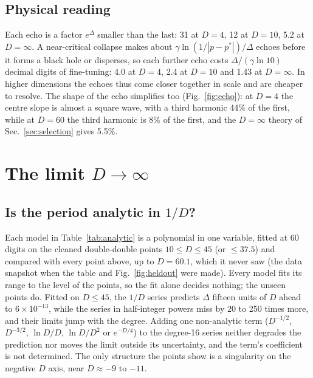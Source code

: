 \documentclass[aps,prd,onecolumn,superscriptaddress,nofootinbib,10pt]{revtex4-2}
\begin{document}
\subsection{Physical reading}

Each echo is a factor $e^{\Delta}$ smaller than the last: 31 at $D = 4$, 12 at $D = 10$, 5.2 at $D = \infty$. A
near-critical collapse makes about $\gamma\ln(1/|p-p^*|)/\Delta$ echoes before it forms a black hole or disperses, so
each further echo costs $\Delta/(\gamma\ln10)$ decimal digits of fine-tuning: 4.0 at $D = 4$, 2.4 at $D = 10$ and 1.43 at
$D = \infty$. In higher dimensions the echoes thus come closer together in scale and are cheaper to resolve. The shape
of the echo simplifies too (Fig.~\ref{fig:echo}): at $D = 4$ the centre slope is almost a square wave, with a third
harmonic 44\% of the first, while at $D = 60$ the third harmonic is 8\% of the first, and the $D = \infty$ theory of
Sec.~\ref{sec:selection} gives 5.5\%.

\section{The limit $D \to \infty$}
\label{sec:limit}

\subsection{Is the period analytic in $1/D$?}

Each model in Table~\ref{tab:analytic} is a polynomial in one variable, fitted at 60 digits on the cleaned
double-double points $10 \le D \le 45$ (or $\le 37.5$) and compared with every point above, up to $D = 60.1$, which it
never saw (the data snapshot when the table and Fig.~\ref{fig:heldout} were made). Every
model fits its range to the level of the points, so the fit alone decides nothing; the unseen points do. Fitted on
$D \le 45$, the $1/D$ series predicts $\Delta$ fifteen units of $D$ ahead to $6\times10^{-13}$, while the series in
half-integer powers miss by 20 to 250 times more, and their limits jump with the degree. Adding one non-analytic term
($D^{-1/2}$, $D^{-3/2}$, $\ln D/D$, $\ln D/D^2$ or $e^{-D/4}$) to the degree-16 series neither degrades the prediction nor
moves the limit outside its uncertainty, and the term's coefficient is not determined. The only structure the points show is a singularity on the
negative $D$ axis, near $D \approx -9$ to $-11$.
\end{document}
